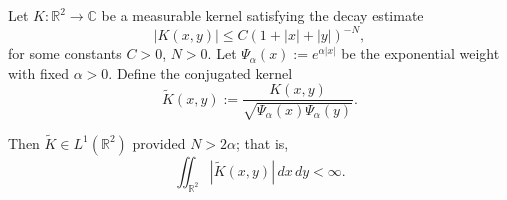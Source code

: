 \begin{lemma}
\label{lem:L1_integrability_conjugated_kernel}
Let \( K \colon \mathbb{R}^2 \to \mathbb{C} \) be a measurable kernel satisfying the decay estimate
\[
|K(x,y)| \le C (1 + |x| + |y|)^{-N},
\]
for some constants \( C > 0 \), \( N > 0 \). Let \( \Psi_\alpha(x) := e^{\alpha |x|} \) be the exponential weight with fixed \( \alpha > 0 \). Define the conjugated kernel
\[
\widetilde{K}(x,y) := \frac{K(x,y)}{\sqrt{\Psi_\alpha(x)\Psi_\alpha(y)}}.
\]

Then \( \widetilde{K} \in L^1(\mathbb{R}^2) \) provided \( N > 2\alpha \); that is,
\[
\iint_{\mathbb{R}^2} |\widetilde{K}(x,y)|\, dx\,dy < \infty.
\]
\end{lemma}
